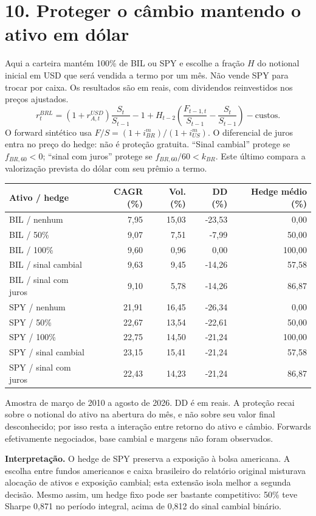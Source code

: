 \documentclass[11pt,a4paper]{article}
\begin{document}
\section*{10. Proteger o câmbio mantendo o ativo em dólar}
Aqui a carteira mantém 100\% de BIL ou SPY e escolhe a fração $H$ do notional inicial em USD que será vendida a termo por um mês. Não vende SPY para trocar por caixa. Os resultados são em reais, com dividendos reinvestidos nos preços ajustados.
\[ r^{BRL}_{t}=(1+r^{USD}_{A,t})\frac{S_t}{S_{t-1}}-1+H_{t-2}\left(\frac{F_{t-1,t}}{S_{t-1}}-\frac{S_t}{S_{t-1}}\right)-\text{custos}. \]
O forward sintético usa $F/S=(1+i^m_{BR})/(1+i^m_{US})$. O diferencial de juros entra no preço do hedge: não é proteção gratuita. ``Sinal cambial'' protege se $f_{BR,60}<0$; ``sinal com juros'' protege se $f_{BR,60}/60<k_{BR}$. Este último compara a valorização prevista do dólar com seu prêmio a termo.
\small\begin{center}\begin{tabular}{lrrrr}\toprule
Ativo / hedge & CAGR (\%) & Vol. (\%) & DD (\%) & Hedge médio (\%) \\ \midrule
BIL / nenhum & 7,95 & 15,03 & -23,53 & 0,00 \\
BIL / 50\% & 9,07 & 7,51 & -7,99 & 50,00 \\
BIL / 100\% & 9,60 & 0,96 & 0,00 & 100,00 \\
BIL / sinal cambial & 9,63 & 9,45 & -14,26 & 57,58 \\
BIL / sinal com juros & 9,10 & 5,78 & -14,26 & 86,87 \\
SPY / nenhum & 21,91 & 16,45 & -26,34 & 0,00 \\
SPY / 50\% & 22,67 & 13,54 & -22,61 & 50,00 \\
SPY / 100\% & 22,75 & 14,50 & -21,24 & 100,00 \\
SPY / sinal cambial & 23,15 & 15,41 & -21,24 & 57,58 \\
SPY / sinal com juros & 22,43 & 14,23 & -21,24 & 86,87 \\
\bottomrule\end{tabular}\end{center}\normalsize

Amostra de março de 2010 a agosto de 2026. DD é em reais. A proteção recai sobre o notional do ativo na abertura do mês, e não sobre seu valor final desconhecido; por isso resta a interação entre retorno do ativo e câmbio. Forwards efetivamente negociados, base cambial e margens não foram observados.

\textbf{Interpretação.} O hedge de SPY preserva a exposição à bolsa americana. A escolha entre fundos americanos e caixa brasileiro do relatório original misturava alocação de ativos e exposição cambial; esta extensão isola melhor a segunda decisão. Mesmo assim, um hedge fixo pode ser bastante competitivo: 50\% teve Sharpe 0,871 no período integral, acima de 0,812 do sinal cambial binário.
\end{document}

